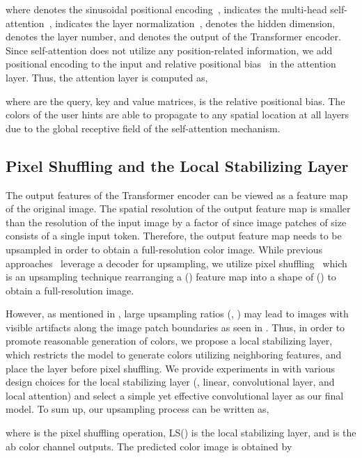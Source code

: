 \documentclass[10pt,twocolumn,letterpaper]{article}
\begin{document}
where  denotes the sinusoidal positional encoding~\cite{vit},  indicates the multi-head self-attention~\cite{attention},  indicates the layer normalization~\cite{layernorm},  denotes the hidden dimension,  denotes the layer number, and  denotes the output of the Transformer encoder. 
Since self-attention does not utilize any position-related information, we add positional encoding  to the input and relative positional bias~\cite{swin, raffel2020exploring, hu2018relation, hu2019local} in the attention layer. 
Thus, the attention layer is computed as, 

where  are the query, key and value matrices,  is the relative positional bias. 
The colors of the user hints are able to propagate to any spatial location at all layers due to the global receptive field of the self-attention mechanism. 


\subsection{Pixel Shuffling and the Local Stabilizing Layer}
The output features of the Transformer encoder  can be viewed as a feature map  of the original image. 
The spatial resolution of the output feature map  is smaller than the resolution of the input image by a factor of  since image patches of size  consists of a single input token. 
Therefore, the output feature map  needs to be upsampled in order to obtain a full-resolution color image. 
While previous approaches~\cite{zhang2017, instanceaware} leverage a decoder for upsampling, we utilize pixel shuffling~\cite{pixelshuffle} which is an upsampling technique rearranging a () feature map into a shape of () to obtain a full-resolution image. 

However, as mentioned in , large upsampling ratios (\eg, ) may lead to images with visible artifacts along the image patch boundaries as seen in . 
Thus, in order to promote reasonable generation of colors, we propose a local stabilizing layer, which restricts the model to generate colors utilizing neighboring features, and place the layer before pixel shuffling. 
We provide experiments in  with various design choices for the local stabilizing layer (\eg, linear, convolutional layer, and local attention) and select a simple yet effective convolutional layer as our final model. 
To sum up, our upsampling process can be written as, 

where  is the pixel shuffling operation, LS() is the local stabilizing layer, and  is the ab color channel outputs. 
The predicted color image  is obtained by 
\end{document}

